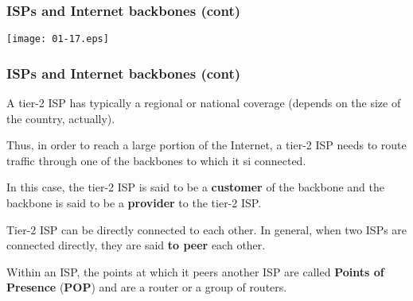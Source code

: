 %
\begin{frame}
\frametitle{ISPs and Internet backbones (cont)}

\begin{center}
\texttt{[image: 01-17.eps]}
\end{center}

\end{frame}

%
\begin{frame}
\frametitle{ISPs and Internet backbones (cont)}

A tier-2 ISP has typically a regional or national coverage (depends on
the size of the country, actually). 

\bigskip

Thus, in order to reach a large portion of the Internet, a tier-2 ISP
needs to route traffic through one of the backbones to which it si
connected.

\bigskip

In this case, the tier-2 ISP is said to be a \textbf{customer} of the
backbone and the backbone is said to be a \textbf{provider} to the
tier-2 ISP.

\bigskip

Tier-2 ISP can be directly connected to each other. In general, when
two ISPs are connected directly, they are said \textbf{to peer} each
other.

\bigskip

Within an ISP, the points at which it peers another ISP are called
\textbf{Points of Presence} (\textbf{POP}) and are a router or a group
of routers.

\end{frame}
